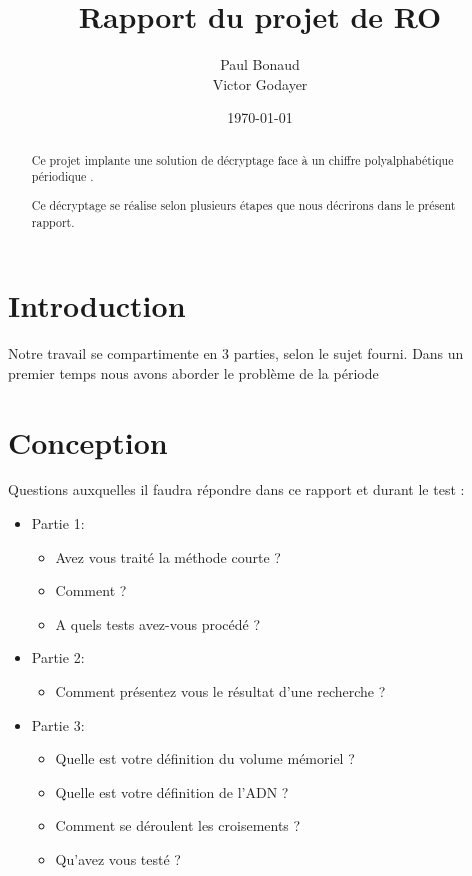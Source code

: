 \documentclass[a4paper, 11pt]{article}
\begin{document}
\title{Rapport du projet de RO}
\author{Paul Bonaud\\
Victor Godayer}
\date\today

\maketitle

\begin{abstract}
  Ce projet implante une solution de décryptage face à un chiffre
  polyalphabétique périodique .

  Ce décryptage se réalise selon plusieurs étapes que nous décrirons
  dans le présent rapport.
\end{abstract}
\newpage
\tableofcontents
\newpage


\section{Introduction}
Notre travail se compartimente en 3 parties, selon le sujet fourni.
Dans un premier temps nous avons aborder le problème de la période

\section{Conception}

Questions auxquelles il faudra répondre dans ce rapport et durant le
test : 
\begin{itemize}
  \item Partie 1:
    \begin{itemize}
      \item Avez vous traité la méthode courte ?
      \item Comment ?
      \item A quels tests avez-vous procédé ?
    \end{itemize}
  \item Partie 2:
    \begin{itemize}
      \item Comment présentez vous le résultat d'une recherche ?
    \end{itemize}
  \item Partie 3:
    \begin{itemize}
      \item Quelle est votre définition du volume mémoriel ?
      \item Quelle est votre définition de l'ADN ?
      \item Comment se déroulent les croisements ?
      \item Qu'avez vous testé ?
    \end{itemize}

\end{itemize}
\end{document}
